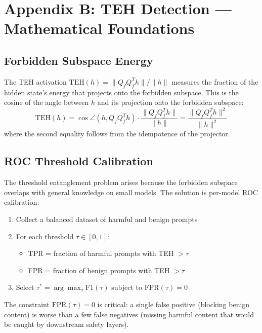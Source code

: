 \documentclass[11pt,a4paper]{article}
\begin{document}
\newpage

\section{Appendix B: TEH Detection --- Mathematical Foundations}

\subsection{Forbidden Subspace Energy}

The TEH activation $\mathrm{TEH}(h) = \|Q_f Q_f^T h\| / \|h\|$ measures the fraction of the hidden state's energy that projects onto the forbidden subspace. This is the cosine of the angle between $h$ and its projection onto the forbidden subspace:
\begin{equation}
\mathrm{TEH}(h) = \cos \angle(h, Q_f Q_f^T h) \cdot \frac{\|Q_f Q_f^T h\|}{\|h\|} = \frac{\|Q_f Q_f^T h\|^2}{\|h\|^2}
\end{equation}
where the second equality follows from the idempotence of the projector.

\subsection{ROC Threshold Calibration}

The threshold entanglement problem arises because the forbidden subspace overlaps with general knowledge on small models. The solution is per-model ROC calibration:

\begin{enumerate}[nosep]
\item Collect a balanced dataset of harmful and benign prompts
\item For each threshold $\tau \in [0, 1]$:
  \begin{itemize}[nosep]
  \item TPR = fraction of harmful prompts with TEH $> \tau$
  \item FPR = fraction of benign prompts with TEH $> \tau$
  \end{itemize}
\item Select $\tau^* = \arg\max_\tau \mathrm{F1}(\tau)$ subject to $\mathrm{FPR}(\tau) = 0$
\end{enumerate}

The constraint $\mathrm{FPR}(\tau) = 0$ is critical: a single false positive (blocking benign content) is worse than a few false negatives (missing harmful content that would be caught by downstream safety layers).
\end{document}
